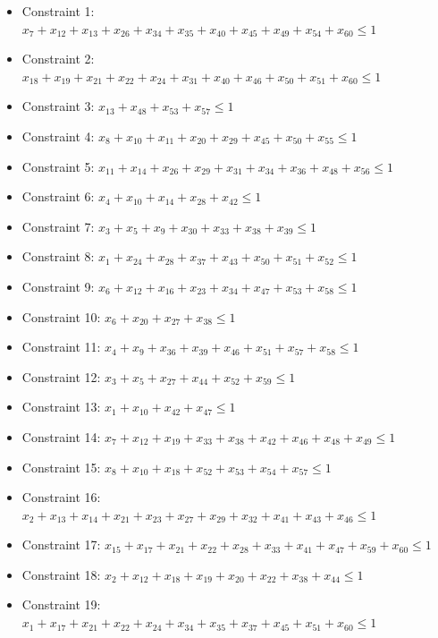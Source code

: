 \documentclass[11pt]{article}
\begin{document}
\begin{itemize}
\item Constraint 1: $x_{7} + x_{12} + x_{13} + x_{26} + x_{34} + x_{35} + x_{40} + x_{45} + x_{49} + x_{54} + x_{60} \le 1$
\item Constraint 2: $x_{18} + x_{19} + x_{21} + x_{22} + x_{24} + x_{31} + x_{40} + x_{46} + x_{50} + x_{51} + x_{60} \le 1$
\item Constraint 3: $x_{13} + x_{48} + x_{53} + x_{57} \le 1$
\item Constraint 4: $x_{8} + x_{10} + x_{11} + x_{20} + x_{29} + x_{45} + x_{50} + x_{55} \le 1$
\item Constraint 5: $x_{11} + x_{14} + x_{26} + x_{29} + x_{31} + x_{34} + x_{36} + x_{48} + x_{56} \le 1$
\item Constraint 6: $x_{4} + x_{10} + x_{14} + x_{28} + x_{42} \le 1$
\item Constraint 7: $x_{3} + x_{5} + x_{9} + x_{30} + x_{33} + x_{38} + x_{39} \le 1$
\item Constraint 8: $x_{1} + x_{24} + x_{28} + x_{37} + x_{43} + x_{50} + x_{51} + x_{52} \le 1$
\item Constraint 9: $x_{6} + x_{12} + x_{16} + x_{23} + x_{34} + x_{47} + x_{53} + x_{58} \le 1$
\item Constraint 10: $x_{6} + x_{20} + x_{27} + x_{38} \le 1$
\item Constraint 11: $x_{4} + x_{9} + x_{36} + x_{39} + x_{46} + x_{51} + x_{57} + x_{58} \le 1$
\item Constraint 12: $x_{3} + x_{5} + x_{27} + x_{44} + x_{52} + x_{59} \le 1$
\item Constraint 13: $x_{1} + x_{10} + x_{42} + x_{47} \le 1$
\item Constraint 14: $x_{7} + x_{12} + x_{19} + x_{33} + x_{38} + x_{42} + x_{46} + x_{48} + x_{49} \le 1$
\item Constraint 15: $x_{8} + x_{10} + x_{18} + x_{52} + x_{53} + x_{54} + x_{57} \le 1$
\item Constraint 16: $x_{2} + x_{13} + x_{14} + x_{21} + x_{23} + x_{27} + x_{29} + x_{32} + x_{41} + x_{43} + x_{46} \le 1$
\item Constraint 17: $x_{15} + x_{17} + x_{21} + x_{22} + x_{28} + x_{33} + x_{41} + x_{47} + x_{59} + x_{60} \le 1$
\item Constraint 18: $x_{2} + x_{12} + x_{18} + x_{19} + x_{20} + x_{22} + x_{38} + x_{44} \le 1$
\item Constraint 19: $x_{1} + x_{17} + x_{21} + x_{22} + x_{24} + x_{34} + x_{35} + x_{37} + x_{45} + x_{51} + x_{60} \le 1$

\end{itemize}
\end{document}
